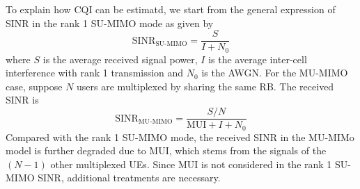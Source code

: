 \documentclass[a4paper,12pt]{article}%
\begin{document}
To explain how CQI can be estimatd, we start from the general expression of SINR in the rank 1 SU-MIMO mode as given by
\begin{equation}\label{eq:sinr-su}
\text{SINR}_{\text{SU-MIMO}} = \frac{S}{I+N_0}
\end{equation}
where $S$ is the average received signal power, $I$ is the average inter-cell interference with rank 1 transmission and $N_0$ is the AWGN. For the MU-MIMO case, suppose $N$ users are multiplexed by sharing the same RB. The received SINR is
\begin{equation}\label{eq:sinr-mu}
\text{SINR}_{\text{MU-MIMO}} = \frac{S/N}{\text{MUI}+I+N_0}
\end{equation}
Compared with the rank 1 SU-MIMO mode, the received SINR in the MU-MIMo model is further degraded due to MUI, which stems from  the signals of the $(N-1)$ other multiplexed UEs. Since MUI is not considered in the rank 1 SU-MIMO SINR, additional treatments are necessary. 
\end{document}

